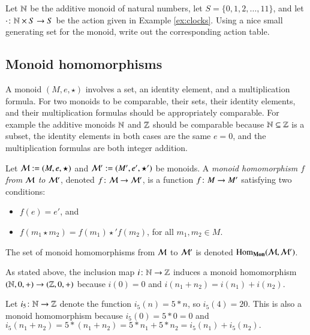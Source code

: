 \begin{example}
\end{example}

\begin{exercise}
Let $\NN$ be the additive monoid of natural numbers, let $S=\{0,1,2,\ldots,11\}$, and let $\cdot\colon{\mathbb N}\times S\rightarrow S$ be the action given in Example \ref{ex:clocks}. Using a nice small generating set for the monoid, write out the corresponding action table.
\end{exercise}


\subsection{Monoid homomorphisms}

A monoid $(M,e,\star)$ involves a set, an identity element, and a multiplication formula. For two monoids to be comparable, their sets, their identity elements, and their multiplication formulas should be appropriately comparable. For example the additive monoids $\NN$ and $\ZZ$ should be comparable because ${\mathbb N}\subseteq{\mathbb Z}$ is a subset, the identity elements in both cases are the same $e=0$, and the multiplication formulas are both integer addition. 

\begin{definition}\label{def:monoid hom}

Let $\mathcal{M}:=(M,e,\star)$ and $\mathcal{M}':=(M',e',\star')$ be monoids. A {\em monoid homomorphism $f$ from $\mathcal{M}$ to $\mathcal{M}'$}, denoted $f\colon\mathcal{M}\rightarrow\mathcal{M}'$, is a function $f\colon M\rightarrow M'$ satisfying two conditions:
\begin{itemize}
\item $f(e)=e'$, and 
\item $f(m_1\star m_2)=f(m_1)\star'f(m_2)$, for all $m_1,m_2\in M$.
\end{itemize}

The set of monoid homomorphisms from $\mathcal{M}$ to $\mathcal{M}'$ is denoted $\Hom_{\Mon}(\mcM,\mcM')$.

\end{definition}

\begin{example}[From $\NN$ to $\ZZ$]\label{ex:nat to int}

As stated above, the inclusion map $i\colon{\mathbb N}\rightarrow{\mathbb Z}$ induces a monoid homomorphism $({\mathbb N},0,+)\rightarrow({\mathbb Z},0,+)$ because $i(0)=0$ and $i(n_1+n_2)=i(n_1)+i(n_2)$. 

Let $i_5\colon{\mathbb N}\rightarrow{\mathbb Z}$ denote the function $i_5(n)=5*n$, so $i_5(4)=20$. This is also a monoid homomorphism because $i_5(0)=5*0=0$ and $i_5(n_1+n_2)=5*(n_1+n_2)=5*n_1+5*n_2=i_5(n_1)+i_5(n_2).$

\end{example}

